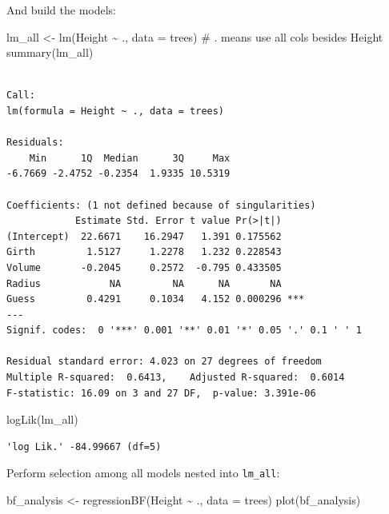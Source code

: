 \documentclass[
  letterpaper,
  DIV=11,
  numbers=noendperiod]{scrreprt}
\newenvironment{Shaded}{\begin{snugshade}}{\end{snugshade}}
\newcommand{\AttributeTok}[1]{\textcolor[rgb]{0.40,0.45,0.13}{#1}}
\newcommand{\CommentTok}[1]{\textcolor[rgb]{0.37,0.37,0.37}{#1}}
\newcommand{\FunctionTok}[1]{\textcolor[rgb]{0.28,0.35,0.67}{#1}}
\newcommand{\NormalTok}[1]{\textcolor[rgb]{0.00,0.23,0.31}{#1}}
\newcommand{\OtherTok}[1]{\textcolor[rgb]{0.00,0.23,0.31}{#1}}
\newcommand{\SpecialCharTok}[1]{\textcolor[rgb]{0.37,0.37,0.37}{#1}}
\begin{document}
And build the models:

\begin{Shaded}
\begin{Highlighting}[]
\NormalTok{lm\_all }\OtherTok{\textless{}{-}} \FunctionTok{lm}\NormalTok{(Height }\SpecialCharTok{\textasciitilde{}}\NormalTok{ ., }\AttributeTok{data =}\NormalTok{ trees) }\CommentTok{\# . means use all cols besides Height}
\FunctionTok{summary}\NormalTok{(lm\_all)}
\end{Highlighting}
\end{Shaded}

\begin{verbatim}

Call:
lm(formula = Height ~ ., data = trees)

Residuals:
    Min      1Q  Median      3Q     Max 
-6.7669 -2.4752 -0.2354  1.9335 10.5319 

Coefficients: (1 not defined because of singularities)
            Estimate Std. Error t value Pr(>|t|)    
(Intercept)  22.6671    16.2947   1.391 0.175562    
Girth         1.5127     1.2278   1.232 0.228543    
Volume       -0.2045     0.2572  -0.795 0.433505    
Radius            NA         NA      NA       NA    
Guess         0.4291     0.1034   4.152 0.000296 ***
---
Signif. codes:  0 '***' 0.001 '**' 0.01 '*' 0.05 '.' 0.1 ' ' 1

Residual standard error: 4.023 on 27 degrees of freedom
Multiple R-squared:  0.6413,    Adjusted R-squared:  0.6014 
F-statistic: 16.09 on 3 and 27 DF,  p-value: 3.391e-06
\end{verbatim}

\begin{Shaded}
\begin{Highlighting}[]
\FunctionTok{logLik}\NormalTok{(lm\_all)}
\end{Highlighting}
\end{Shaded}

\begin{verbatim}
'log Lik.' -84.99667 (df=5)
\end{verbatim}

Perform selection among all models nested into \texttt{lm\_all}:

\begin{Shaded}
\begin{Highlighting}[]
\NormalTok{bf\_analysis }\OtherTok{\textless{}{-}} \FunctionTok{regressionBF}\NormalTok{(Height }\SpecialCharTok{\textasciitilde{}}\NormalTok{ ., }\AttributeTok{data =}\NormalTok{ trees)}
\FunctionTok{plot}\NormalTok{(bf\_analysis)}
\end{Highlighting}
\end{Shaded}
\end{document}

